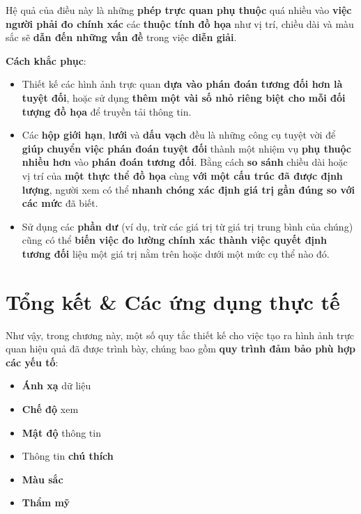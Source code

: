 Hệ quả của điều này là những \textbf{phép trực quan phụ thuộc} quá nhiều
vào \textbf{việc người phải đo chính xác} các \textbf{thuộc tính đồ họa}
như vị trí, chiều dài và màu sắc sẽ \textbf{dẫn đến những vấn đề} trong
việc \textbf{diễn giải}.

\textbf{Cách khắc phục}:

\begin{itemize}
\item
  Thiết kế các hình ảnh trực quan \textbf{dựa vào phán đoán tương đối
  hơn là tuyệt đối}, hoặc sử dụng \textbf{thêm một vài số nhỏ riêng biệt
  cho mỗi đối tượng đồ họa} để truyền tải thông tin.
\item
  Các \textbf{hộp giới hạn}, \textbf{lưới} và \textbf{dấu vạch} đều là
  những công cụ tuyệt vời để \textbf{giúp chuyển việc phán đoán tuyệt
  đối} thành một nhiệm vụ \textbf{phụ thuộc nhiều hơn} vào \textbf{phán
  đoán tương đối}. Bằng cách \textbf{so sánh} chiều dài hoặc vị trí của
  \textbf{một thực thể đồ họa} cùng \textbf{với một cấu trúc đã được
  định lượng}, người xem có thể \textbf{nhanh chóng xác định giá trị gần
  đúng so với các mức} đã biết.
\item
  Sử dụng các \textbf{phần dư} (ví dụ, trừ các giá trị từ giá trị trung
  bình của chúng) cũng có thể \textbf{biến việc đo lường chính xác thành
  việc quyết định tương đối} liệu một giá trị nằm trên hoặc dưới một mức
  cụ thể nào đó.
\end{itemize}

\section{Tổng kết \& Các ứng dụng thực
tế}\label{tux1ed5ng-kux1ebft-cuxe1c-ux1ee9ng-dux1ee5ng-thux1ef1c-tux1ebf}

Như vậy, trong chương này, một số quy tắc thiết kế cho việc tạo ra hình
ảnh trực quan hiệu quả đã được trình bày, chúng bao gồm \textbf{quy
trình đảm bảo phù hợp các yếu tố}:

\begin{itemize}
\tightlist
\item
  \textbf{Ánh xạ} dữ liệu
\item
  \textbf{Chế độ} xem
\item
  \textbf{Mật độ} thông tin
\item
  Thông tin \textbf{chú thích}
\item
  \textbf{Màu sắc}
\item
  \textbf{Thẩm mỹ}
\end{itemize}

